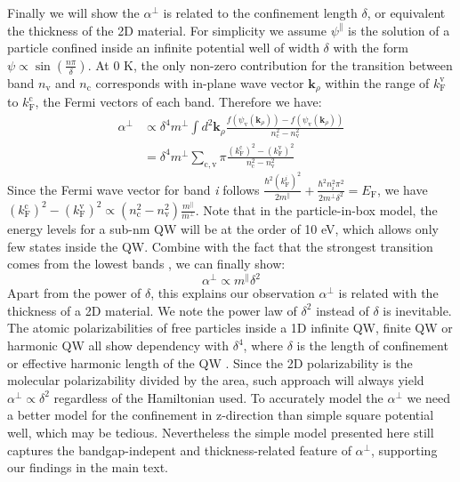 \documentclass[manuscript=suppinfo,email=true,hyperref=true,keywords=false]{achemso}
\begin{document}
Finally we will show the $\alpha^{\perp}$ is related to the
confinement length $\delta$, or equivalent the thickness of the 2D
material. For simplicity we assume $\psi^{\parallel}$ is the solution
of a particle confined inside an infinite potential well of width
$\delta$ with the form $\psi \propto \sin(\frac{n\pi}{\delta})$. At 0
K, the only non-zero contribution for the transition between band
$n_{\mathrm{v}}$ and $n_{\mathrm{c}}$ corresponds with in-plane wave
vector $\mathbf{k}_{\rho}$ within the range of $k_{\mathrm{F}}^{\mathrm{v}}$ to
$k_{\mathrm{F}}^{\mathrm{c}}$, the Fermi vectors of each band. Therefore we have:
\begin{equation}
  \begin{aligned}
    \alpha^{\perp} &\propto \delta^{4} m^{\perp} \int
    d^{2}\mathbf{k}_{\rho}
    \frac{f(\psi_{\mathrm{v}}(\mathbf{k}_{\rho}))
      -f(\psi_{\mathrm{v}}(\mathbf{k}_{\rho})) }{n_{\mathrm{c}}^{2} -
      n_{\mathrm{v}}^{2}}\\
    &= \delta^{4} m^{\perp} \sum_{\mathrm{c, v}}\pi \frac{
      (k_{\mathrm{F}}^{\mathrm{c}})^{2} -
        (k_{\mathrm{F}}^{\mathrm{v}})^{2}}{n_{\mathrm{c}}^{2} -
        n_{\mathrm{v}}^{2}}
  \end{aligned}
\end{equation}
Since the Fermi wave vector for band \textit{i} follows
${\displaystyle
  \frac{\hbar^{2}(k_{\mathrm{F}}^{i})^{2}}{2m^{\parallel}}} +
{\displaystyle \frac{\hbar^{2} n_{i}^{2} \pi^{2}}{2m^{\perp}
    \delta^{2}}} = E_{\mathrm{F}}$, we have
$ (k_{\mathrm{F}}^{\mathrm{c}})^{2} -
(k_{\mathrm{F}}^{\mathrm{v}})^{2} \propto (n_{\mathrm{c}}^{2} -
n_{\mathrm{v}}^{2}) {\displaystyle
  \frac{m^{\parallel}}{m^{\perp}}}$. Note that in the particle-in-box
model, the energy levels for a sub-nm QW will be at the order of 10
eV, which allows only few states inside the QW. Combine with the fact
that the strongest transition comes from the lowest bands
\cite{davies_physics_1997}, we can finally show:
\begin{equation}
  \label{eq:alpha-perp-L}
  \alpha^{\perp} \propto m^{\parallel} \delta^{2}
\end{equation}
Apart from the power of $\delta$, this explains our observation
$\alpha^{\perp}$ is related with the thickness of a 2D material. We
note the power law of $\delta^{2}$ instead of $\delta$ is
inevitable. The atomic polarizabilities of free particles inside a 1D
infinite QW, finite QW or harmonic QW all show dependency with
$\delta^{4}$, where $\delta$ is the length of confinement or effective
harmonic length of the QW \cite{Fowler_1984,Maize_2011}. Since the 2D
polarizability is the molecular polarizability divided by the area,
such approach will always yield $\alpha^{\perp} \propto \delta^{2}$
regardless of the Hamiltonian used. To accurately model the
$\alpha^{\perp}$ we need a better model for the confinement in
z-direction than simple square potential well, which may be
tedious. Nevertheless the simple model presented here still captures
the bandgap-indepent and thickness-related feature of
$\alpha^{\perp}$, supporting our findings in the main text.
\end{document}
